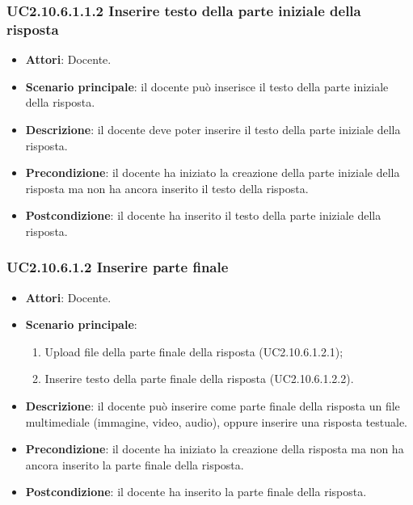 \subsubsection{UC2.10.6.1.1.2 Inserire testo della parte iniziale della risposta}
\begin{itemize}
\item \textbf{Attori}: Docente.
\item \textbf{Scenario principale}: il docente può inserisce il testo della parte iniziale della risposta.
\item \textbf{Descrizione}: il docente deve poter inserire il testo della parte iniziale della risposta.
\item \textbf{Precondizione}: il docente ha iniziato la creazione della parte iniziale della risposta ma non ha ancora inserito il testo della risposta.
\item \textbf{Postcondizione}: il docente ha inserito il testo della parte iniziale della risposta.
\end{itemize}
\subsubsection{UC2.10.6.1.2 Inserire parte finale}
\begin{itemize}
\item \textbf{Attori}: Docente.
\item \textbf{Scenario principale}:
\begin{enumerate}
\item Upload file della parte finale della risposta (UC2.10.6.1.2.1);
\item Inserire testo della parte finale della risposta (UC2.10.6.1.2.2).
\end{enumerate}
\item \textbf{Descrizione}: il docente può inserire come parte finale della risposta un file multimediale (immagine, video, audio), oppure inserire una risposta testuale.
\item \textbf{Precondizione}: il docente ha iniziato la creazione della risposta ma non ha ancora inserito la parte finale della risposta.
\item \textbf{Postcondizione}: il docente ha inserito la parte finale della risposta.
\end{itemize}
